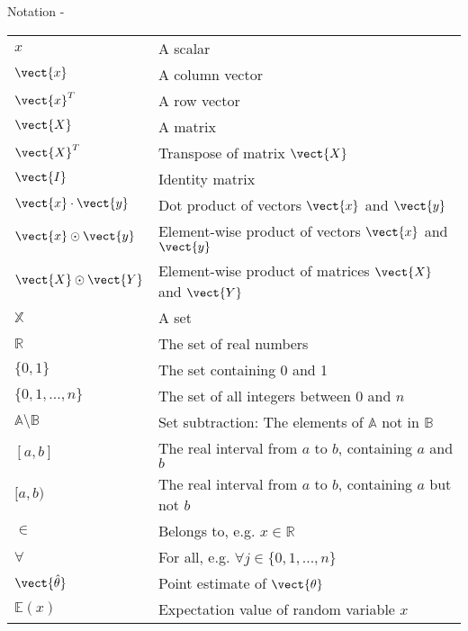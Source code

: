 
\begin{frame}[allowframebreaks,t]{Notation -}

\begin{longtable}{| p{} | p{} |} 
$x$                       & A scalar \\
$\vect{x}$                & A column vector \\
$\vect{x}^T$              & A row vector \\
$\vect{X}$                & A matrix \\
$\vect{X}^T$              & Transpose of matrix  $\vect{X}$ \\
$\vect{I}$                & Identity matrix \\
$\vect{x} \cdot \vect{y}$ & Dot product of vectors $\vect{x}$ and $\vect{y}$ \\
$\vect{x} \odot \vect{y}$ & Element-wise product of vectors $\vect{x}$ and $\vect{y}$ \\
$\vect{X} \odot \vect{Y}$ & Element-wise product of matrices $\vect{X}$ and $\vect{Y}$ \\
$\mathbb{X}$              & A set \\
$\mathbb{R}$              & The set of real numbers \\
$\{0,1\}$                 & The set containing 0 and 1 \\
$\{0,1,...,n\}$           & The set of all integers between 0 and $n$ \\
$\mathbb{A}\setminus\mathbb{B}$  & Set subtraction: The elements of $\mathbb{A}$ not in $\mathbb{B}$\\
$[a,b]$                   & The real interval from $a$ to $b$, containing $a$ and $b$\\
$[a,b)$                   & The real interval from $a$ to $b$, containing $a$ but not $b$\\
$\in$                     & Belongs to, e.g. $x \in \mathbb{R}$ \\
$\forall$                 & For all, e.g. $\forall j \in \{0,1,...,n\}$ \\
$\vect{\hat{\theta}}$     & Point estimate of $\vect{\theta}$ \\
$\mathbb{E}(x)$           & Expectation value of random variable $x$ \\
\end{longtable}

\end{frame}
